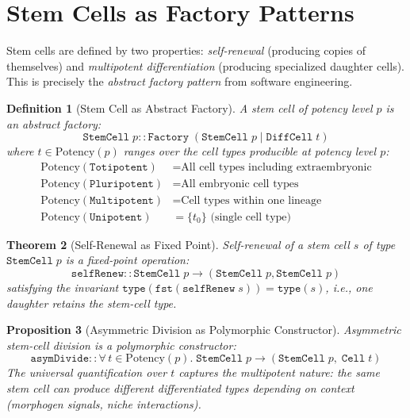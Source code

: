 \documentclass[12pt,a4paper]{article}
\newtheorem{theorem}{Theorem}[section]
\newtheorem{proposition}[theorem]{Proposition}
\newtheorem{definition}[theorem]{Definition}
\newcommand{\ie}{\textit{i.e.}}
\begin{document}
\section{Stem Cells as Factory Patterns}\label{sec:stemcells}

Stem cells are defined by two properties: \emph{self-renewal}
(producing copies of themselves) and \emph{multipotent
differentiation} (producing specialized daughter cells).  This
is precisely the \emph{abstract factory pattern} from software
engineering.

\begin{definition}[Stem Cell as Abstract Factory]\label{def:stem-factory}
A stem cell of potency level $p$ is an abstract factory:
\[
  \texttt{StemCell}\;p :: \texttt{Factory}
    \;(\texttt{StemCell}\;p \;|\; \texttt{DiffCell}\;t)
\]
where $t \in \text{Potency}(p)$ ranges over the cell types
producible at potency level $p$:
\begin{align*}
  \text{Potency}(\texttt{Totipotent}) &= \text{All cell types including extraembryonic} \\
  \text{Potency}(\texttt{Pluripotent}) &= \text{All embryonic cell types} \\
  \text{Potency}(\texttt{Multipotent}) &= \text{Cell types within one lineage} \\
  \text{Potency}(\texttt{Unipotent}) &= \{t_0\} \text{ (single cell type)}
\end{align*}
\end{definition}

\begin{theorem}[Self-Renewal as Fixed Point]\label{thm:self-renewal}
Self-renewal of a stem cell $s$ of type $\texttt{StemCell}\;p$
is a fixed-point operation:
\[
  \texttt{selfRenew} :: \texttt{StemCell}\;p \to
    (\texttt{StemCell}\;p, \texttt{StemCell}\;p)
\]
satisfying the invariant $\texttt{type}(\texttt{fst}(\texttt{selfRenew}\;s))
= \texttt{type}(s)$, \ie, one daughter retains the stem-cell type.
\end{theorem}

\begin{proposition}[Asymmetric Division as Polymorphic Constructor]
Asymmetric stem-cell division is a polymorphic constructor:
\[
  \texttt{asymDivide} :: \forall\, t \in \text{Potency}(p).\;
  \texttt{StemCell}\;p \to (\texttt{StemCell}\;p,\; \texttt{Cell}\;t)
\]
The universal quantification over $t$ captures the multipotent
nature: the same stem cell can produce different differentiated
types depending on context (morphogen signals, niche interactions).
\end{proposition}
\end{document}
